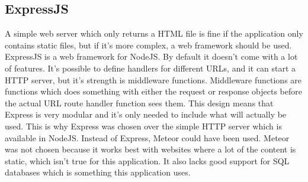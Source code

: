\subsection{ExpressJS}
A simple web server which only returns a HTML file is fine if the application only contains static files, but if it's more complex, a web framework should be used. ExpressJS is a web framework for NodeJS. By default it doesn't come with a lot of features. It's possible to define handlers for different URLs, and it can start a HTTP server, but it's strength is middleware functions. Middleware functions are functions which does something with either the request or response objects before the actual URL route handler function sees them. This design means that Express is very modular and it's only needed to include what will actually be used. This is why Express was chosen over the simple HTTP server which is available in NodeJS. Instead of Express, Meteor could have been used. Meteor was not chosen because it works best with websites where a lot of the content is static, which isn't true for this application. It also lacks good support for SQL databases which is something this application uses.

